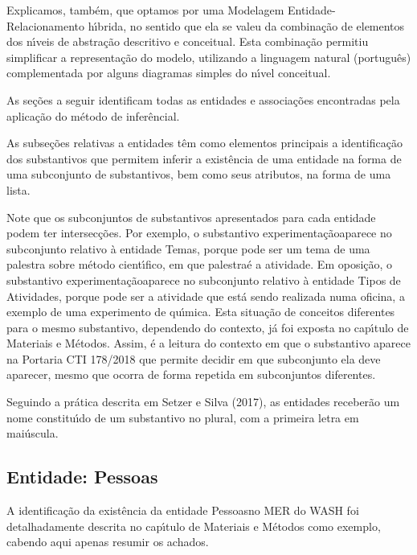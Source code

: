 \documentclass[
12pt,		%
openright,	%
twoside,  %
a4paper,			%
chapter=TITLE,		%
english,			%
french,				%
spanish,			%
brazil				%
]{USPSC-classe/USPSC}
\begin{document}
Explicamos, tamb\'em, que optamos por uma Modelagem Entidade-Relacionamento h\'{\i}brida, no sentido que ela se valeu da combina\c{c}\~ao de elementos dos n\'{\i}veis de abstra\c{c}\~ao descritivo e conceitual. Esta combina\c{c}\~ao permitiu simplificar a representa\c{c}\~ao do modelo, utilizando a linguagem natural (portugu\^es) complementada por alguns diagramas simples do n\'{\i}vel conceitual.


As se\c{c}\~oes a seguir identificam todas as entidades e associa\c{c}\~oes encontradas pela aplica\c{c}\~ao do m\'etodo de infer\^encial.


As subse\c{c}\~oes relativas a entidades t\^em como elementos principais a identifica\c{c}\~ao dos substantivos que permitem inferir a exist\^encia de uma entidade na forma de uma subconjunto de substantivos, bem como seus atributos, na forma de uma lista.


Note que os subconjuntos de substantivos apresentados para cada entidade podem ter intersec\c{c}\~oes. Por exemplo, o substantivo \textquotedbl experimenta\c{c}\~ao\textquotedbl  aparece no subconjunto relativo \`a entidade \textquotedbl Temas\textquotedbl , porque pode ser um tema de uma palestra sobre m\'etodo cient\'{\i}fico, em que \textquotedbl palestra\textquotedbl  \'e a atividade. Em oposi\c{c}\~ao, o substantivo \textquotedbl experimenta\c{c}\~ao\textquotedbl  aparece no subconjunto relativo \`a entidade \textquotedbl Tipos de Atividades\textquotedbl , porque pode ser a atividade que est\'a sendo realizada numa oficina, a exemplo de uma experimento de qu\'{\i}mica. Esta situa\c{c}\~ao de conceitos diferentes para o mesmo substantivo, dependendo do contexto, j\'a foi exposta no cap\'{\i}tulo de Materiais e M\'etodos. Assim, \'e a leitura do contexto em que o substantivo aparece na Portaria CTI 178/2018 que permite decidir em que subconjunto ela deve aparecer, mesmo que ocorra de forma repetida em subconjuntos diferentes.


Seguindo a pr\'atica descrita em  Setzer e Silva (2017), as entidades receber\~ao um nome constitu\'{\i}do de um substantivo no plural, com a primeira letra em mai\'uscula.


\subsection[Entidade: Pessoas]{Entidade: Pessoas}\label{Entidade: Pessoas}
A identifica\c{c}\~ao da exist\^encia da entidade \textquotedbl Pessoas\textquotedbl  no MER do WASH foi detalhadamente descrita no cap\'{\i}tulo de Materiais e M\'etodos como exemplo, cabendo aqui apenas resumir os achados.
\end{document}
